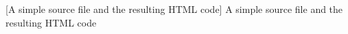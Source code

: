 [A simple source file and the resulting HTML code]{%
A simple source file and the resulting HTML code 
}%
